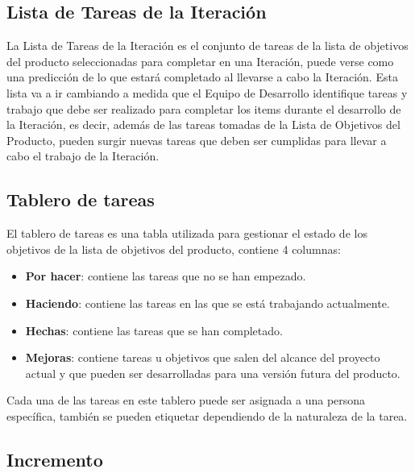 \subsection{Lista de Tareas de la Iteración}
La Lista de Tareas de la Iteración es el conjunto de tareas de la lista de objetivos del producto seleccionadas para completar en una Iteración, puede verse como una predicción de lo que estará completado al llevarse a cabo la Iteración. \cite{scrumSchwaber} Esta lista va a ir cambiando a medida que el Equipo de Desarrollo identifique tareas y trabajo que debe ser realizado para completar los items durante el desarrollo de la Iteración, es decir, además de las tareas tomadas de la Lista de Objetivos del Producto, pueden surgir nuevas tareas que deben ser cumplidas para llevar a cabo el trabajo de la Iteración.

\subsection{Tablero de tareas}
El tablero de tareas es una tabla utilizada para gestionar el estado de los objetivos de la lista de objetivos del producto, contiene 4 columnas:

\begin{itemize}
   \item \textbf{Por hacer}: contiene las tareas que no se han empezado.
   \item \textbf{Haciendo}: contiene las tareas en las que se está trabajando actualmente.
   \item \textbf{Hechas}: contiene las tareas que se han completado.
   \item \textbf{Mejoras}: contiene tareas u objetivos que salen del alcance del proyecto actual y que pueden ser desarrolladas para una versión futura del producto.
\end{itemize}

Cada una de las tareas en este tablero puede ser asignada a una persona específica, también se pueden etiquetar dependiendo de la naturaleza de la tarea.

\subsection{Incremento} \label{incremento}


